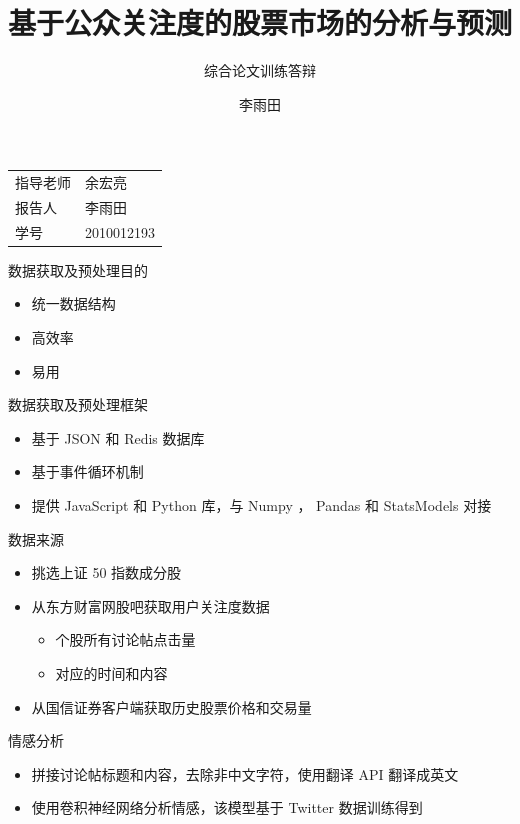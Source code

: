 \documentclass{beamer}
\title{基于公众关注度的股票市场的分析与预测}
\subtitle{综合论文训练答辩}
\author{李雨田}
\institute{清华大学}
\begin{document}
\begin{frame}
\titlepage
\begin{center}
  \begin{tabular}{ll}
    指导老师 & 余宏亮 \\
    报告人 & 李雨田 \\
    学号 & 2010012193
  \end{tabular}
\end{center}
\end{frame}

\begin{frame}{数据获取及预处理}{目的}
\begin{itemize}
  \item 统一数据结构
  \pause
  \item 高效率
  \pause
  \item 易用
\end{itemize}
\end{frame}

\begin{frame}{数据获取及预处理}{框架}
\begin{itemize}
  \item 基于 JSON 和 Redis 数据库
  \pause
  \item 基于事件循环机制
  \pause
  \item 提供 JavaScript 和 Python 库，与 Numpy ， Pandas 和 StatsModels 对接
\end{itemize}
\end{frame}

\begin{frame}{数据来源}
\begin{itemize}
  \item 挑选上证 50 指数成分股
  \pause
  \item 从东方财富网股吧获取用户关注度数据
  \begin{itemize}
    \item 个股所有讨论帖点击量
    \item 对应的时间和内容
  \end{itemize}
  \pause
  \item 从国信证券客户端获取历史股票价格和交易量
\end{itemize}
\end{frame}

\begin{frame}{情感分析}
\begin{itemize}
  \item 拼接讨论帖标题和内容，去除非中文字符，使用翻译 API 翻译成英文
  \pause
  \item 使用卷积神经网络分析情感，该模型基于 Twitter 数据训练得到
\end{itemize}
\end{frame}
\end{document}
